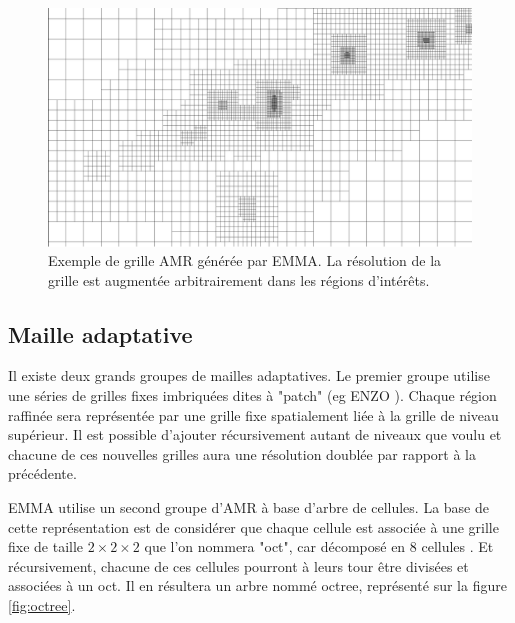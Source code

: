 \begin{figure}
        \includegraphics[width=.95\linewidth]{img/02/AMR.pdf} 
        \caption[Grille générée par EMMA]{Exemple de grille \ac{AMR} générée par EMMA. 
        La  résolution de la grille est augmentée arbitrairement dans les régions d'intérêts.
 		\label{fig:AMR}}
\end{figure}

\subsection{Maille adaptative}

Il existe deux grands groupes de mailles adaptatives.
Le premier groupe utilise une séries de grilles fixes imbriquées dites à "patch" (eg ENZO \cite{bryan_enzo:_2014}).
Chaque région raffinée sera représentée par une grille fixe spatialement liée à la grille de niveau supérieur.
Il est possible d'ajouter récursivement autant de niveaux que voulu et chacune de ces nouvelles grilles aura une résolution doublée par rapport à la précédente.

EMMA utilise un second groupe d'\ac{AMR} à base d'arbre de cellules. %
La base de cette représentation est de considérer que chaque cellule est associée à une grille fixe de taille $2 \times 2 \times 2$ que l'on nommera "oct", car décomposé en 8 cellules \citep{khokhlov_fully_1998-1}.
Et récursivement, chacune de ces cellules pourront à leurs tour être divisées et associées à un oct.
Il en résultera un arbre nommé octree, représenté sur la figure \ref{fig:octree}.


